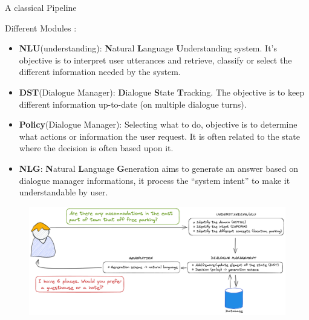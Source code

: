 \documentclass[10pt,aspectratio=169]{beamer}
\begin{document}
\begin{frame}{A classical Pipeline}

        \begin{block}{Different Modules :}
            \begin{itemize}
                \item \textbf{NLU}(understanding): \textbf{N}atural \textbf{L}anguage \textbf{U}nderstanding system. It's objective is to interpret user utterances and retrieve, classify or select the different information needed by the system. 
                \item \textbf{DST}(Dialogue Manager): \textbf{D}ialogue \textbf{S}tate \textbf{T}racking. The objective is to keep different information up-to-date (on multiple dialogue turns).
                \item \textbf{Policy}(Dialogue Manager): Selecting what to do, objective is to determine what actions or information the user request. It is often related to the state where the decision is often based upon it. 
                \item \textbf{NLG}: \textbf{N}atural \textbf{L}anguage \textbf{G}eneration aims to generate an answer based on dialogue manager informations, it process the ``system intent'' to make it understandable by user.
            \end{itemize}
        \end{block}
 
\end{frame}

\begin{frame}
    \begin{figure}
        \centering
        \includegraphics[width=1.\textwidth]{media/dialogue_task_complete.png}
    \end{figure}
\end{frame}
\end{document}
